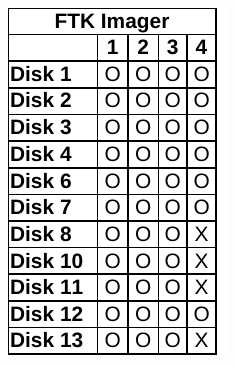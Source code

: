 \begin{paraphrase}
\begin{figure}
\begin{subfigure}[t]{0.17\linewidth}
        \includegraphics[width=\linewidth]{fig/ftk_results_ntfs.pdf}
    \end{subfigure}~~
    \begin{subfigure}[t]{0.17\linewidth}

\end{subfigure}
\end{figure}
\end{paraphrase}

